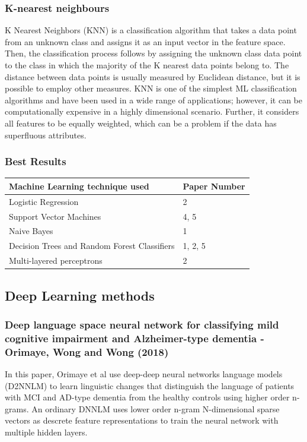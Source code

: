 \subsubsection{K-nearest neighbours}
K Nearest Neighbors (KNN) is a classification algorithm that takes a data point from an unknown class and assigns it as an input vector in the feature space. Then, the classification process follows by assigning the unknown class data point to the class in which the majority of the K nearest data points belong to. The distance between data points is usually measured by Euclidean distance, but it is possible to employ other measures. KNN is one of the simplest ML classification algorithms and have been used in a wide range of applications; however, it can be computationally expensive in a highly dimensional scenario. Further, it considers all features to be equally weighted, which can be a problem if the data has superfluous attributes.

\subsubsection{Best Results}
\begin{table}[H]
	\begin{center}
	\begin{tabular}{ p{6cm} | p{6cm} }
	\hline
	Machine Learning technique used & Paper Number \\ \hline
	Logistic Regression & 2 \\ \hline
	Support Vector Machines & 4, 5 \\ \hline
	Naive Bayes & 1 \\ \hline
	Decision Trees and Random Forest Classifiers & 1, 2, 5 \\ \hline
	Multi-layered perceptrons & 2 \\ \hline
	\hline 
	\end{tabular}
	\end{center}
\end{table}


\subsection{Deep Learning methods}
\subsubsection{Deep language space neural network for classifying mild cognitive impairment and Alzheimer-type dementia - Orimaye, Wong and Wong (2018)}
In this paper, Orimaye et al use deep-deep neural networks language models (D2NNLM) to learn linguistic changes that distinguish the language of patients with MCI and AD-type dementia from the healthy controls using higher order n-grams. An ordinary DNNLM uses lower order n-gram N-dimensional sparse vectors as descrete feature representations to train the neural network with multiple hidden layers.


